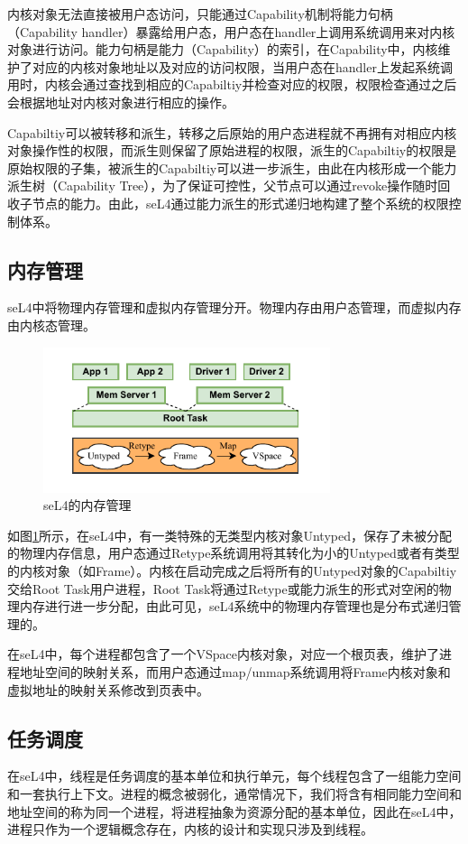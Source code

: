 内核对象无法直接被用户态访问，只能通过Capability机制将能力句柄（Capability handler）暴露给用户态，用户态在handler上调用系统调用来对内核对象进行访问。能力句柄是能力（Capability）的索引，在Capability中，内核维护了对应的内核对象地址以及对应的访问权限，当用户态在handler上发起系统调用时，内核会通过查找到相应的Capabiltiy并检查对应的权限，权限检查通过之后会根据地址对内核对象进行相应的操作。

Capabiltiy可以被转移和派生，转移之后原始的用户态进程就不再拥有对相应内核对象操作性的权限，而派生则保留了原始进程的权限，派生的Capabiltiy的权限是原始权限的子集，被派生的Capabiltiy可以进一步派生，由此在内核形成一个能力派生树（Capability Tree），为了保证可控性，父节点可以通过revoke操作随时回收子节点的能力。由此，seL4通过能力派生的形式递归地构建了整个系统的权限控制体系。

\subsection{内存管理}
seL4中将物理内存管理和虚拟内存管理分开。物理内存由用户态管理，而虚拟内存由内核态管理。

\begin{figure}[htbp]
  \centering
  \includegraphics[width=0.75\textwidth]{figures/seL4_mm.drawio.pdf}
  \caption{seL4的内存管理}\label{fig:seL4_mm}
\end{figure}

如图\ref{fig:seL4_mm}所示，在seL4中，有一类特殊的无类型内核对象Untyped，保存了未被分配的物理内存信息，用户态通过Retype系统调用将其转化为小的Untyped或者有类型的内核对象（如Frame）。内核在启动完成之后将所有的Untyped对象的Capabiltiy交给Root Task用户进程，Root Task将通过Retype或能力派生的形式对空闲的物理内存进行进一步分配，由此可见，seL4系统中的物理内存管理也是分布式递归管理的。

在seL4中，每个进程都包含了一个VSpace内核对象，对应一个根页表，维护了进程地址空间的映射关系，而用户态通过map/unmap系统调用将Frame内核对象和虚拟地址的映射关系修改到页表中。

\subsection{任务调度}
\label{sec:sel4_task}
在seL4中，线程是任务调度的基本单位和执行单元，每个线程包含了一组能力空间和一套执行上下文。进程的概念被弱化，通常情况下，我们将含有相同能力空间和地址空间的称为同一个进程，将进程抽象为资源分配的基本单位，因此在seL4中，进程只作为一个逻辑概念存在，内核的设计和实现只涉及到线程。

